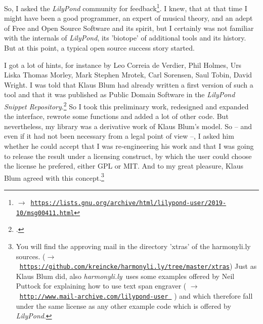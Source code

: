 \documentclass[
  DIV=calc,
  BCOR=5mm,
  12pt,
  headings=small,
  oneside,
  abstract=true,
  toc=bib,
  xcolor=dvipsnames,
  openany,
  ngerman,english]{scrartcl}
\newcommand{\acc}[0]{\textit}
\newcommand{\ra}[0]{$\rightarrow$}
\newcommand{\lnka}[1]{\href{#1}{\texttt{#1}}}
\newcommand{\hlyn}[0]{\textit{harmonyli.ly}}
\newcommand{\lily}[0]{\textit{LilyPond}}
\begin{document}
So, I asked the \acc{LilyPond} community for feedback\footnote{\ra\
\lnka{https://lists.gnu.org/archive/html/lilypond-user/2019-10/msg00411.html}}.
I knew, that at that time I might have been a good programmer, an expert of
musical theory, and an adept of Free and Open Source Software and its spirit,
but I certainly was not familiar with the internals of \acc{LilyPond}, its
'biotope' of additional tools and its history. But at this point, a typical open
source success story started.

I got a lot of hints, for instance by Leo Correia de Verdier, Phil Holmes, Urs
Liska Thomas Morley, Mark Stephen Mrotek, Carl Sorensen, Saul Tobin, David
Wright. I was told that Klaus Blum had already written a first version of such a
tool and that it was published as Public Domain Software in the \acc{LilyPond
Snippet Repository}.\footcite[cf.][\nopage wp]{Blum2019a} So I took this
preliminary work, redesigned and expanded the interface, rewrote some functions
and added a lot of other code. But nevertheless, my library was a derivative
work of Klaus Blum's model. So -- and even if it had not been necessary from a
legal point of view --, I asked him whether he could accept that I was
re-engineering his work and that I was going to release the result under a
licensing construct, by which the user could choose the license he prefered,
either GPL or MIT. And to my great pleasure, Klaus Blum agreed with this
concept.\footnote{You will find the approving mail in the directory 'xtras' of
the harmonyli.ly sources. (\ra\
\lnka{https://github.com/kreincke/harmonyli.ly/tree/master/xtras}) Just as Klaus
Blum did, also \hlyn\ uses some examples offered by Neil Puttock for explaining
how to use text span engraver ( \ra\
\lnka{http://www.mail-archive.com/lilypond-user%
} )
and which therefore fall under the same license as any other example code which
is offered by \lily. }
\end{document}
